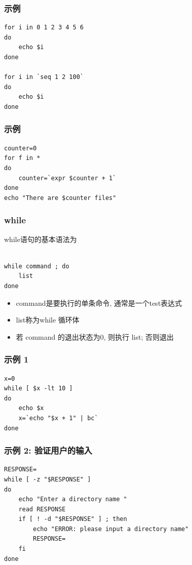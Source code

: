 \documentclass[compress]{beamer}
\begin{document}
\begin{frame}[fragile]
\frametitle{示例}

\begin{lstlisting}
for i in 0 1 2 3 4 5 6
do
    echo $i
done

for i in `seq 1 2 100`
do
    echo $i
done
\end{lstlisting}
\end{frame}

\begin{frame}[fragile]
  \frametitle{示例}

\begin{lstlisting}
counter=0
for f in *
do
    counter=`expr $counter + 1`
done
echo "There are $counter files"
\end{lstlisting}
\end{frame}

\begin{frame}[fragile]
\frametitle{while}

while语句的基本语法为\\
{
\begin{Verbatim}

while command ; do
    list
done
\end{Verbatim}
}

\begin{itemize}
\item command是要执行的单条命令, 通常是一个test表达式
\item list称为while 循环体
\item 若 command 的退出状态为0, 则执行 list; 否则退出
\end{itemize}
\end{frame}

\begin{frame}[fragile]
\frametitle{示例 1}

\begin{lstlisting}
x=0
while [ $x -lt 10 ]
do
    echo $x
    x=`echo "$x + 1" | bc`
done
\end{lstlisting}
\end{frame}

\begin{frame}[fragile]
  \frametitle{示例 2: 验证用户的输入}
\begin{lstlisting}
RESPONSE=
while [ -z "$RESPONSE" ]
do
    echo "Enter a directory name "
    read RESPONSE
    if [ ! -d "$RESPONSE" ] ; then
        echo "ERROR: please input a directory name"
        RESPONSE=
    fi
done
\end{lstlisting}
\end{frame}
\end{document}
